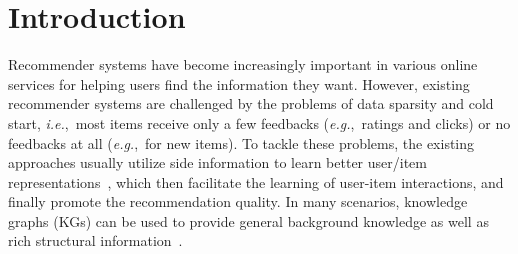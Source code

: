 \documentclass[sigconf]{acmart}
\newcommand{\new}[1]{{\color{black} #1}}
\newcommand{\ie}{\emph{i.e.},~}
\newcommand{\eg}{\emph{e.g.},~}
\begin{document}



\maketitle




\section{Introduction}
Recommender systems have become increasingly important in various online services for helping users find the information they want. However, existing recommender systems are challenged by the problems of data sparsity and cold start, \ie most items receive only a few feedbacks (\eg ratings and clicks) or no feedbacks at all (\eg for new items).
\new{To tackle these problems, the existing approaches usually utilize side information to learn better user/item representations~\cite{koren2008factorization, he2018nais, kabbur2013fism}, which then facilitate the learning of user-item interactions, and finally promote the recommendation quality.
In many scenarios, knowledge graphs (KGs) can be used to provide general background knowledge as well as rich structural information~\cite{zhang2016collaborative, wang2018ripplenet, huang2018improving}.}
\end{document}
